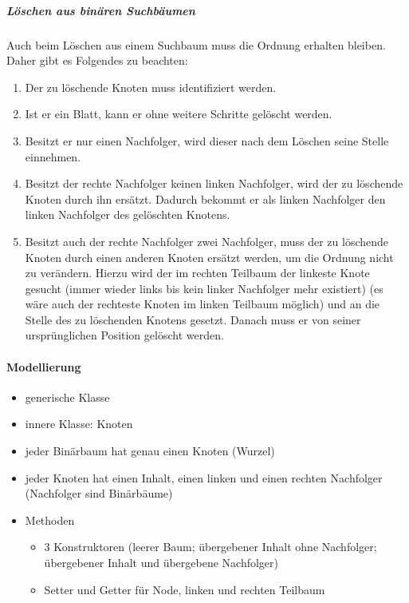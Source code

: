 \documentclass{article}
\begin{document}
	\subparagraph{Löschen aus binären Suchbäumen}
	
	Auch beim Löschen aus einem Suchbaum muss die Ordnung erhalten bleiben. Daher gibt es Folgendes zu beachten: 
	
	\begin{enumerate}
		\item Der zu löschende Knoten muss identifiziert werden. 
		\item Ist er ein Blatt, kann er ohne weitere Schritte gelöscht werden.
		\item Besitzt er nur einen Nachfolger, wird dieser nach dem Löschen seine Stelle einnehmen.
		\item Besitzt der rechte Nachfolger keinen linken Nachfolger, wird der zu löschende Knoten durch ihn ersätzt. Dadurch bekommt er als linken Nachfolger den linken Nachfolger des gelöschten Knotens.
		\item Besitzt auch der rechte Nachfolger zwei Nachfolger, muss der zu löschende Knoten durch einen anderen Knoten ersätzt werden, um die Ordnung nicht zu verändern. Hierzu wird der im rechten Teilbaum der linkeste Knote gesucht (immer wieder links bis kein linker Nachfolger mehr existiert) (es wäre auch der rechteste Knoten im linken Teilbaum möglich) und an die Stelle des zu löschenden Knotens gesetzt. Danach muss er von seiner ursprünglichen Position gelöscht werden.
	\end{enumerate}
	
	\paragraph{Modellierung}
	
	\begin{itemize}
		\item generische Klasse
		\item innere Klasse: Knoten
		\item jeder Binärbaum hat genau einen Knoten (Wurzel)
		\item jeder Knoten hat einen Inhalt, einen linken und einen rechten Nachfolger (Nachfolger sind Binärbäume)
		\item Methoden
		\begin{itemize}
			\item 3 Konstruktoren (leerer Baum; übergebener Inhalt ohne Nachfolger; übergebener Inhalt und übergebene Nachfolger)
			\item Setter und Getter für Node, linken und rechten Teilbaum
		\end{itemize}
	\end{itemize}
	
\end{document}
